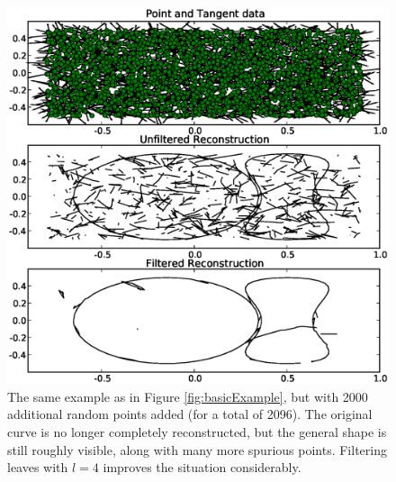 \documentclass{article}
\numberwithin{cntr}{section}
\numberwithin{equation}{section}
\begin{document}
\begin{figure}
\setlength{\unitlength}{0.240900pt}
\ifx\plotpoint\undefined\newsavebox{\plotpoint}\fi
\sbox{\plotpoint}{\rule[-0.200pt]{0.400pt}{0.400pt}}%
\includegraphics[scale=0.5]{more_noisy_example.eps}

\caption{The same example as in Figure \ref{fig:basicExample}, but with 2000 additional random points added (for a total of 2096). The original curve is no longer completely reconstructed, but the general shape is still roughly visible, along with many more spurious points. Filtering leaves with $l=4$ improves the situation considerably.}
\label{fig:moreNoisyExample}
\end{figure}



\end{document}
